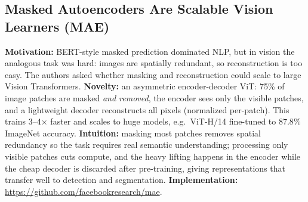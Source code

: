 \documentclass[11pt,a4paper]{article}
\begin{document}
\subsection{Masked Autoencoders Are Scalable Vision Learners (MAE)}
\textbf{Motivation:} BERT-style masked prediction dominated NLP, but in vision the
analogous task was hard: images are spatially redundant, so reconstruction is too
easy. The authors asked whether masking and reconstruction could scale to large
Vision Transformers.
\textbf{Novelty:} an asymmetric encoder-decoder ViT: 75\% of image patches are masked
\emph{and removed}, the encoder sees only the visible patches, and a lightweight
decoder reconstructs all pixels (normalized per-patch). This trains 3--4$\times$
faster and scales to huge models, e.g.\ ViT-H/14 fine-tuned to $87.8\%$ ImageNet
accuracy.
\textbf{Intuition:} masking most patches removes spatial redundancy so the task
requires real semantic understanding; processing only visible patches cuts compute,
and the heavy lifting happens in the encoder while the cheap decoder is discarded
after pre-training, giving representations that transfer well to detection and
segmentation.
\textbf{Implementation:} \url{https://github.com/facebookresearch/mae}.
\end{document}
